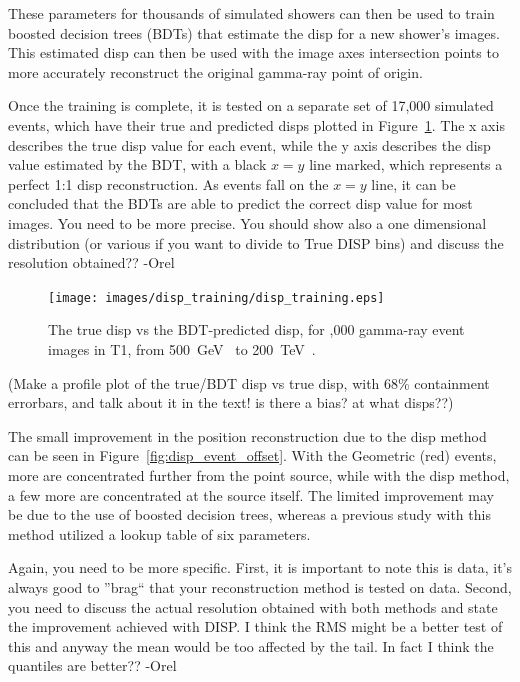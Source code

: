     These parameters for thousands of simulated showers can then be used to train boosted decision trees (BDTs) that estimate the disp for a new shower's images.
    This estimated disp can then be used with the image axes intersection points to more accurately reconstruct the original gamma-ray point of origin.
    
    Once the training is complete, it is tested on a separate set of 17,000 simulated events, which have their true and predicted disps plotted in Figure~\ref{fig:disptraining}.
    The x axis describes the true disp value for each event, while the y axis describes the disp value estimated by the BDT, with a black $x=y$ line marked, which represents a perfect 1:1 disp reconstruction.
    As events fall on the $x=y$ line, it can be concluded that the BDTs are able to predict the correct disp value for most images.
    {\color{red} You need to be more precise.  You should show also a one dimensional distribution (or various if you want to divide to True DISP bins) and discuss the resolution obtained?? -Orel}

    \begin{figure}[!t]
      \centering
      \texttt{[image: images/disp\_training/disp\_training.eps]}
      \caption[Disp BDT Training]{
        The true disp vs the BDT-predicted disp, for ,000 gamma-ray event images in T1, from \SI{500}{\GeV{}} to \SI{200}{\TeV{}}.
      }
      \label{fig:disptraining}
    \end{figure}
    
    {\color{red}(Make a profile plot of the true/BDT disp vs true disp, with 68\% containment errorbars, and talk about it in the text! is there a bias? at what disps??)}

    The small improvement in the position reconstruction due to the disp method can be seen in Figure~\ref{fig:disp_event_offset}.
    With the Geometric (red) events, more are concentrated further from the point source, while with the disp method, a few more are concentrated at the source itself.
    The limited improvement may be due to the use of boosted decision trees, whereas a previous study with this method utilized a lookup table of six parameters\cite{Beilicke2012NIM}.
    
    {\color{red}Again, you need to be more specific. First, it is important to note this is data, it's always good to ''brag`` that your reconstruction method is tested on data.  Second, you need to discuss the actual resolution obtained with both methods and state the improvement achieved with DISP. I think the RMS might be a better test of this and anyway the mean would be too affected by the tail. In fact I think the quantiles are better?? -Orel}
    
